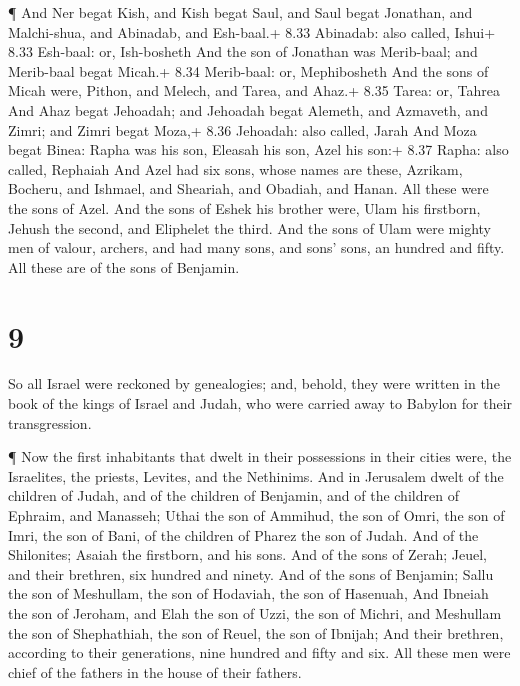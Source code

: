  ¶ And Ner begat Kish, and Kish begat Saul, and Saul begat
Jonathan, and Malchi-shua, and Abinadab, and Esh-baal.+ 8.33 Abinadab:
also called, Ishui+ 8.33 Esh-baal: or, Ish-bosheth  And the
son of Jonathan was Merib-baal; and Merib-baal begat Micah.+ 8.34
Merib-baal: or, Mephibosheth  And the sons of Micah were,
Pithon, and Melech, and Tarea, and Ahaz.+ 8.35 Tarea: or, Tahrea
 And Ahaz begat Jehoadah; and Jehoadah begat Alemeth, and
Azmaveth, and Zimri; and Zimri begat Moza,+ 8.36 Jehoadah: also called,
Jarah  And Moza begat Binea: Rapha was his son, Eleasah his
son, Azel his son:+ 8.37 Rapha: also called, Rephaiah  And
Azel had six sons, whose names are these, Azrikam, Bocheru, and Ishmael,
and Sheariah, and Obadiah, and Hanan. All these were the sons of Azel.
 And the sons of Eshek his brother were, Ulam his
firstborn, Jehush the second, and Eliphelet the third.  And
the sons of Ulam were mighty men of valour, archers, and had many sons,
and sons' sons, an hundred and fifty. All these are of the sons of
Benjamin.

\hypertarget{section-8}{%
\section{9}\label{section-8}}

 So all Israel were reckoned by genealogies; and, behold,
they were written in the book of the kings of Israel and Judah, who were
carried away to Babylon for their transgression.

 ¶ Now the first inhabitants that dwelt in their possessions
in their cities were, the Israelites, the priests, Levites, and the
Nethinims.  And in Jerusalem dwelt of the children of Judah,
and of the children of Benjamin, and of the children of Ephraim, and
Manasseh;  Uthai the son of Ammihud, the son of Omri, the
son of Imri, the son of Bani, of the children of Pharez the son of
Judah.  And of the Shilonites; Asaiah the firstborn, and his
sons.  And of the sons of Zerah; Jeuel, and their brethren,
six hundred and ninety.  And of the sons of Benjamin; Sallu
the son of Meshullam, the son of Hodaviah, the son of Hasenuah,
 And Ibneiah the son of Jeroham, and Elah the son of Uzzi,
the son of Michri, and Meshullam the son of Shephathiah, the son of
Reuel, the son of Ibnijah;  And their brethren, according to
their generations, nine hundred and fifty and six. All these men were
chief of the fathers in the house of their fathers.

